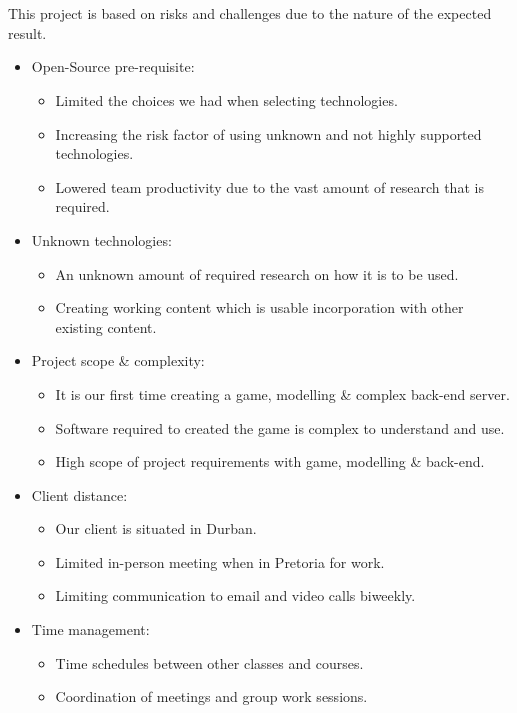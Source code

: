 \documentclass[letterpaper]{article}
\begin{document}
		\newpage
		\vspace{0.2in}
	\section*{\colorbox{black}{}} 
		\vspace{0.1in}
		
		This project is based on risks and challenges due to the nature of the expected result.
		
		\begin{itemize}
			\item Open-Source pre-requisite:
				\begin{itemize}
					\item Limited the choices we had when selecting technologies.
					\item Increasing the risk factor of using unknown and not highly supported technologies.
					\item Lowered team productivity due to the vast amount of research that is required.
				\end{itemize}
			\item Unknown technologies:
				\begin{itemize}
					\item An unknown amount of required research on how it is to be used.
					\item Creating working content which is usable incorporation with other existing content.
				\end{itemize}
			\item Project scope \& complexity:
				\begin{itemize}
					\item It is our first time creating a game, modelling \& complex back-end server.
					\item Software required to created the game is complex to understand and use.
					\item High scope of project requirements with game, modelling \& back-end.
				\end{itemize}
			\item Client distance:
				\begin{itemize}
					\item Our client is situated in Durban.
					\item Limited in-person meeting when in Pretoria for work.
					\item Limiting communication to email and video calls biweekly.
				\end{itemize}
			\item Time management:
				\begin{itemize}
					\item Time schedules between other classes and courses.
					\item Coordination of meetings and group work sessions.
				\end{itemize}
		\end{itemize}
		
\end{document}
